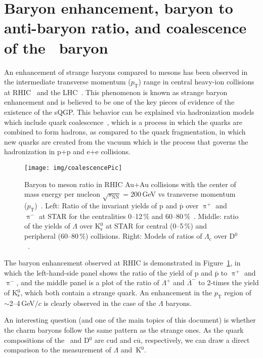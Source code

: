 \section{Baryon enhancement, baryon to anti-baryon ratio, and coalescence of the \Lambdac\ baryon}

An enhancement of strange baryons compared to mesons has been observed in the intermediate transverse momentum ($p_\mathrm{T}$) range in central heavy-ion collisions at RHIC~\cite{STARLambda} and the LHC~\cite{LambdaALICE}\@. This phenomenon is known as strange baryon enhancement and is believed to be one of the key pieces of evidence of the existence of the sQGP\@. This behavior can be explained via hadronization models which include quark coalescence~\cite{coalescenceKrakow,coalescenceKFKI}, which is a process in which the quarks are combined to form hadrons, as compared to the quark fragmentation, in which new quarks are created from the vacuum which is the process that governs the hadronization in p+p and e+e collisions.  

\begin{figure}
\centering
\texttt{[image: img/coalescencePic]}
\caption{Baryon to meson ratio in RHIC Au+Au collisions with the center of mass energy per nucleon $\sqrt{s_\mathrm{NN}} = 200\,$GeV vs transverse momentum ($p_\mathrm{T}$)~\cite{GuannanLc}\@. Left: Ratio of the invariant yields of p and $\overline{\mathrm{p}}$ over $\uppi^+$ and $\uppi^-$ at STAR for the centralities 0--12$\,\%$ and 60--80$\,\%$~\cite{STARLambda}. Middle: ratio of the yields of $\Lambda$ over K$^0_\mathrm{s}$ at STAR for central (0--5$\,\%$) and peripheral (60--80$\,\%$) collisions. Right: Models of ratios of $\Lambda_\mathrm{c}$ over D$^0$~\cite{LcCoalescence_OhKoLeeYasui, Ghosh_Lc_rescattering, SHM}.}
\label{fig:LambdaKzero}
\end{figure}

The baryon enhancement observed at RHIC is demonstrated in Figure~\ref{fig:LambdaKzero}, in which the left-hand-side panel shows the ratio of the yield of p and $\overline{\mathrm{p}}$ to $\uppi^+$ and $\uppi^-$, and the middle panel is a plot of the ratio of $\Lambda^+$ and $\overline{\Lambda}^-$ to 2-times the yield of K$^0_\mathrm{s}$, which both contain a strange quark. An enhancement in the $p_\mathrm{T}$ region of $\sim$2--4$\,$GeV$/c$ is clearly observed in the case of the $\Lambda$ baryons. 

An interesting question (and one of the main topics of this document) is whether the charm baryons follow the same pattern as the strange ones. As the quark compositions of the \Lambdac\ and D$^0$ are cud and c$\overline{\mathrm{u}}$, respectively, we can draw a direct comparison to the measurement of $\Lambda$ and~K$^0$.

